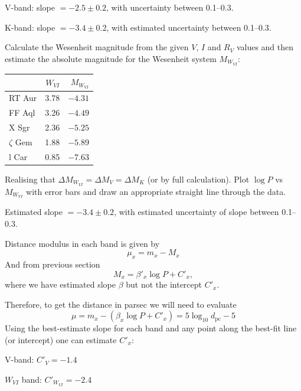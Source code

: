 \begin{description}
  V-band: slope $= -2.5 \pm 0.2$, with uncertainty between 0.1--0.3.

  K-band: slope $= -3.4 \pm 0.2$, with estimated uncertainty between
  0.1--0.3.

\item[(D1.2)] Calculate the Wesenheit magnitude from the given $V$, $I$ and
  $R_V$ values and then estimate the absolute magnitude for the Wesenheit
  system $M_{W_{VI}}$:

  \begin{center}
  \begin{tabular}{lrr}
    & $W_{VI}$ & $M_{W_{VI}}$ \\
    \hline
    RT Aur      & 3.78 & $-4.31$ \\
    FF Aql      & 3.26 & $-4.49$ \\
    X Sgr       & 2.36 & $-5.25$ \\
    $\zeta$ Gem & 1.88 & $-5.89$ \\
    l Car       & 0.85 & $-7.63$ \\
  \end{tabular}
  \end{center}

  Realising that $\Delta M_{W_{VI}} = \Delta M_V = \Delta M_K$ (or by full
  calculation). Plot $\log P$ vs $M_{W_{VI}}$ with error bars and draw an
  appropriate straight line through the data.

  Estimated slope $= -3.4 \pm 0.2$, with estimated uncertainty of slope
  between 0.1--0.3.

\item[(D1.3)] Distance modulus in each band is given by
  \[ \mu_x = m_x - M_x \]
  And from previous section
  \[ M_x = \beta'_x \log P + C'_x , \]
  where we have estimated slope $\beta$ but not the intercept $C'_x$.

  Therefore, to get the distance in parsec we will need to evaluate
  \[ \mu = m_x - (\beta_x\log P + C'_x) = 5\log_{10} d_{\mathrm{pc}} - 5 \]
  Using the best-estimate slope for each band and any point along the
  best-fit line (or intercept) one can estimate $C'_x$:

  V-band: $C'_V = -1.4$

  $W_{VI}$ band: $C'_{W_{VI}} = -2.4$


\end{description}

